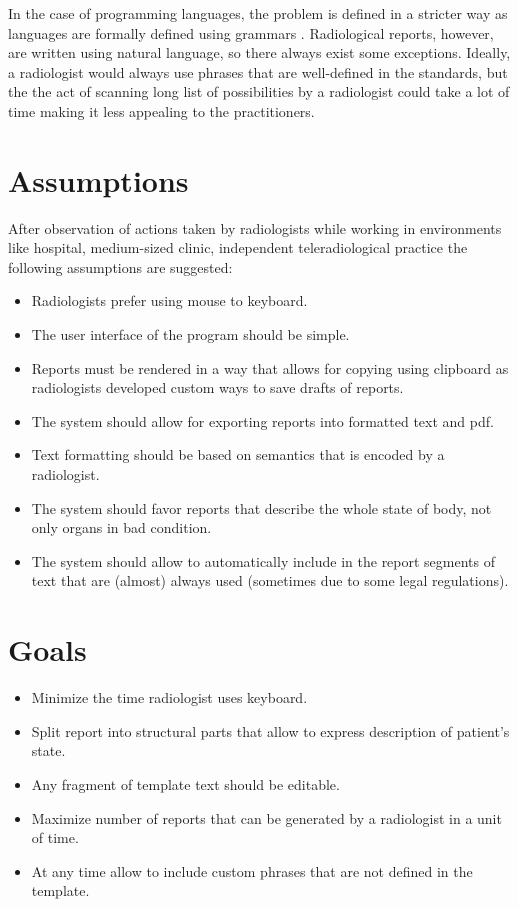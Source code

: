 \documentclass[12pt, twoside, openany]{report}
\theoremstyle{definition}
\begin{document}
In the case of programming languages, the problem is defined in a stricter way as languages are formally defined using grammars \cite{csharp-spec}. Radiological reports, however, are written using natural language, so there always exist some exceptions. Ideally, a radiologist would always use phrases that are well-defined in the standards, but the the act of scanning long list of possibilities by a radiologist could take a lot of time making it less appealing to the practitioners.


\section{Assumptions}
After observation of actions taken by radiologists while working in environments like hospital, medium-sized clinic, independent teleradiological practice the following assumptions are suggested:
\begin{itemize}
	\item Radiologists prefer using mouse to keyboard.
	\item The user interface of the program should be simple.
	\item Reports must be rendered in a way that allows for copying using clipboard as radiologists developed custom ways to save drafts of reports.
	\item The system should allow for exporting reports into formatted text and pdf.
	\item Text formatting should be based on semantics that is encoded by a radiologist.
	\item The system should favor reports that describe the whole state of body, not only organs in bad condition.
	\item The system should allow to automatically include in the report segments of text that are (almost) always used (sometimes due to some legal regulations).
	
\end{itemize}
\section{Goals}
\begin{itemize}
	\item Minimize the time radiologist uses keyboard.
	\item Split report into structural parts that allow to express description of patient's state.
	\item Any fragment of template text should be editable. 
	\item Maximize number of reports that can be generated by a radiologist in a unit of time.
	\item At any time allow to include custom phrases that are not defined in the template.
\end{itemize}
\end{document}
